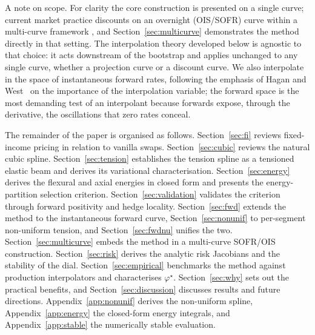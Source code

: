 \documentclass[]{interact}
\theoremstyle{plain}
\begin{document}
A note on scope. For clarity the core construction is presented on a single curve; current
market practice discounts on an overnight (OIS/SOFR) curve within a multi-curve framework
\cite{Bianchetti,Henrard}, and Section~\ref{sec:multicurve} demonstrates the method directly in
that setting. The interpolation theory developed below is agnostic to that choice: it acts
downstream of the bootstrap and applies unchanged to any single curve, whether a projection
curve or a discount curve. We also interpolate in the space of instantaneous forward rates, following the
emphasis of Hagan and West~\cite{Hagan} on the importance of the interpolation variable; the
forward space is the most demanding test of an interpolant because forwards expose, through the
derivative, the oscillations that zero rates conceal.

The remainder of the paper is organised as follows. Section~\ref{sec:fi} reviews fixed-income
pricing in relation to vanilla swaps. Section~\ref{sec:cubic} reviews the natural cubic spline.
Section~\ref{sec:tension} establishes the tension spline as a tensioned elastic beam and
derives its variational characterisation. Section~\ref{sec:energy} derives the flexural and
axial energies in closed form and presents the energy-partition selection criterion.
Section~\ref{sec:validation} validates the criterion through forward positivity and hedge
locality. Section~\ref{sec:fwd} extends the method to the instantaneous forward curve,
Section~\ref{sec:nonunif} to per-segment non-uniform tension, and Section~\ref{sec:fwdnu}
unifies the two. Section~\ref{sec:multicurve} embeds the method in a multi-curve SOFR/OIS
construction. Section~\ref{sec:risk} derives the analytic risk Jacobians and the stability of the
dial. Section~\ref{sec:empirical} benchmarks the method against production interpolators and
characterises $\varphi^\star$. Section~\ref{sec:why} sets out the
practical benefits, and Section~\ref{sec:discussion} discusses results and future directions.
Appendix~\ref{app:nonunif} derives the non-uniform spline, Appendix~\ref{app:energy} the
closed-form energy integrals, and Appendix~\ref{app:stable} the numerically stable evaluation.
\end{document}
